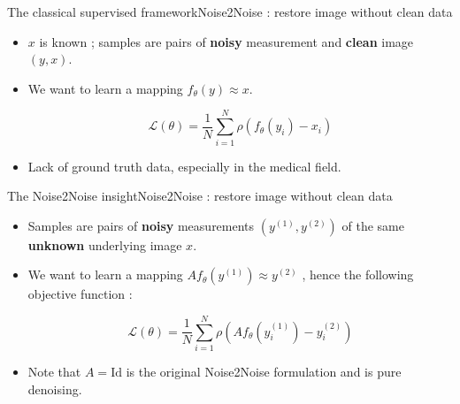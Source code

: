 \documentclass{beamer}
\numberwithin{proposition}{section}
\begin{document}
\begin{frame}{The classical supervised framework}{Noise2Noise : restore image without clean data}
    
    \begin{itemize}
        \item $x$ is known ; samples are pairs of \textbf{noisy} measurement and \textbf{clean} image $(y, x)$.
        \item We want to learn a mapping $f_\theta(y) \approx x$.
    
    \begin{equation}
        \mathcal{L}(\theta) = \frac{1}{N} \sum_{i=1}^N \rho\left(f_\theta\left(y_i\right) - x_i\right)
        \label{supervised_loss}
    \end{equation}

    \end{itemize}


    \begin{itemize}
        \item Lack of ground truth data, especially in the medical field.
    \end{itemize}

\end{frame}




\begin{frame}{The Noise2Noise insight}{Noise2Noise : restore image without clean data}
    
    \begin{itemize}
        \item Samples are pairs of \textbf{noisy} measurements $(y^{(1)}, y^{(2)})$ of the same \textbf{unknown} underlying image $x$.

        \item We want to learn a mapping $Af_\theta(y^{(1)}) \approx y^{(2)}$ \cite{xia_training_nodate}, hence the following objective function :
    
    \begin{equation}
        \mathcal{L}(\theta) = \frac{1}{N} \sum_{i=1}^N \rho\left(Af_\theta\left(y_i^{(1)}\right) - y_i^{(2)}\right)
        \label{n2n_loss}
    \end{equation}

    \item Note that $A = \text{Id}$ is the original Noise2Noise formulation  \cite{lehtinen_noise2noise_2018} and is pure denoising.

    \end{itemize}

\end{frame}
\end{document}
